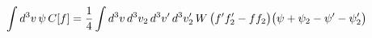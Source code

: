 \documentclass[preview]{standalone}
\begin{document}
\begin{align*}
\special{dvisvgm:raw <g id='unique000'>}\int d^3v\,\psi\,C[f]=\frac14\int d^3v\,d^3v_2\,d^3v'\,d^3v_2'\,W\,\big(f'f_2'-ff_2\big)\big(\psi+\psi_2-\psi'-\psi_2'\big)\special{dvisvgm:raw </g>}
\end{align*}
\end{document}
